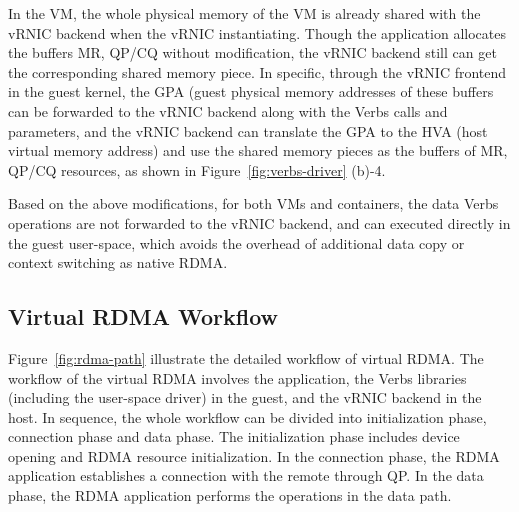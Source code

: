 In the VM, the whole physical memory of the VM is already shared with the vRNIC backend when the vRNIC instantiating. Though the application allocates the buffers MR, QP/CQ without modification, the vRNIC backend still can get the corresponding shared memory piece. In specific, through the vRNIC frontend in the guest kernel, the GPA (guest physical memory addresses of these buffers can be forwarded to the vRNIC backend along with the Verbs calls and parameters, and the vRNIC backend can translate the GPA to the HVA (host virtual memory address) and use the shared memory pieces as the buffers of MR, QP/CQ resources, as shown in Figure~\ref{fig:verbs-driver} (b)-4.


Based on the above modifications, for both VMs and containers,  the data Verbs operations are not forwarded to the vRNIC backend, and can executed directly in the guest user-space, which avoids the overhead of additional data copy or context switching as native RDMA.

\subsection{Virtual RDMA Workflow}
Figure~\ref{fig:rdma-path} illustrate the detailed workflow of virtual RDMA. The workflow of the virtual RDMA involves the application, the Verbs libraries (including the user-space driver) in the guest, and the vRNIC backend in the host. In sequence, the whole workflow can be divided into initialization phase, connection phase and data phase. The initialization phase includes device opening and RDMA resource initialization. In the connection phase, the RDMA application establishes a connection with the remote through QP. In the data phase, the RDMA application performs the operations in the data path.

